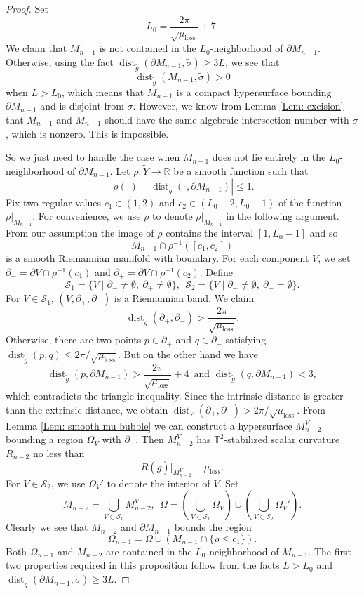 \documentclass[11pt,letterpaper]{amsart}
\numberwithin{equation}{section}
\theoremstyle{definition}
\DeclareMathOperator{\dist}{dist}
\begin{document}
\begin{proof}
Set
$$
L_0=\frac{2\pi}{\sqrt{\mu_{\mathrm{loss}}}}+7.
$$
We claim that $M_{n-1}$ is not contained in the $L_0$-neighborhood of $\partial M_{n-1}$. Otherwise, using the fact
$
\dist_{\tilde g}(\partial M_{n-1},\tilde \sigma)\geq 3L$,
we see that $$\dist_{\tilde g}(M_{n-1},\tilde \sigma)>0$$ when $L>L_0$, which means that $M_{n-1}$ is a compact hypersurface bounding $\partial M_{n-1}$ and is disjoint from $\tilde \sigma$. However, we know from Lemma \ref{Lem: excision} that $M_{n-1}$ and $\tilde M_{n-1}$ should have the same algebraic intersection number with $\sigma$, which is nonzero. This is impossible.

So we just need to handle the case when $M_{n-1}$ does not lie entirely in the $L_0$-neighborhood of $\partial M_{n-1}$. Let $\rho:\tilde Y\to \mathbb R$ be a smooth function such that
$$
|\rho(\cdot)-\dist_{\tilde g}(\cdot,\partial M_{n-1})|\leq 1.
$$
Fix two regular values $c_1\in(1,2)$ and $c_2\in(L_0-2,L_0-1)$ of the function $\rho|_{M_{n-1}}$. For convenience, we use $\rho$ to denote $\rho|_{M_{n-1}}$ in the following argument. From our assumption the image of $\rho$ contains the interval $[1,L_0-1]$ and so
$$
M_{n-1}\cap  \rho^{-1}([c_1,c_2])
$$
is a smooth Riemannian {manifold with boundary. For each component $V$, we set $\partial_-=\partial V\cap\rho^{-1}(c_1)$ and $\partial_+=\partial V\cap\rho^{-1}(c_2)$. Define
\[
\mathcal{S}_{1} = \{V \mid \partial_-\neq\emptyset, \ \partial_+\neq\emptyset\}, \ \
\mathcal{S}_{2} = \{V \mid \partial_-\neq\emptyset, \ \partial_+=\emptyset \}.
\]
For $V\in\mathcal{S}_{1}$, $(V,\partial_{+},\partial_{-})$ is a Riemannian band.} We claim
$$
\dist_{\tilde g}(\partial_+,\partial_-)>\frac{2\pi}{\sqrt{\mu_{\mathrm{loss}}}}.
$$
Otherwise, there are two points $p\in \partial_+$ and $q\in \partial_-$ satisfying $\dist_{\tilde g}(p,q)\leq 2\pi/\sqrt{\mu_{\mathrm{loss}}}$. But on the other hand we have
$$\dist_{\tilde g}(p,\partial M_{n-1})>\frac{2\pi}{\sqrt{\mu_{\mathrm{loss}}}}+4 \, \mbox{ and }  \dist_{\tilde g}(q,\partial M_{n-1})<3,$$
which contradicts the triangle inequality. Since the intrinsic distance is greater than the extrinsic distance, we obtain $\dist_V(\partial_+,\partial_-)>2\pi/\sqrt{\mu_{\mathrm{loss}}}$. From Lemma \ref{Lem: smooth mu bubble} we can construct a hypersurface $M_{n-2}^{V}$ bounding a region $\Omega_{V}$ with $\partial_-$. Then $M_{n-2}^{V}$ has $\mathbb T^2$-stabilized scalar curvature $R_{n-2}$ no less than
$$
R(\tilde g)|_{M_{n-2}^{V}}-\mu_{\mathrm{loss}}.
$$
{For $V\in\mathcal{S}_{2}$, we use $\Omega_{V}'$ to denote the interior of $V$. Set}
\[
M_{n-2} = \bigcup_{V\in\mathcal{S}_{1}}M_{n-2}^{V}, \ \
\Omega = \left(\bigcup_{V\in\mathcal{S}_{1}}\Omega_{V}\right)\cup\left(\bigcup_{V\in\mathcal{S}_{2}}\Omega_{V}'\right).
\]
Clearly we see that $M_{n-2}$ and $\partial M_{n-1}$ bounds the region
$$
\Omega_{n-1}=\Omega\cup(M_{n-1}\cap {\{\rho\leq c_{1}\}}).
$$
Both $\Omega_{n-1}$ and $M_{n-2}$ are contained in  the $L_0$-neighborhood of $M_{n-1}$. The first two properties required in this proposition follow from the facts $L>L_0$ and $\dist_{\tilde g}(\partial M_{n-1},\tilde \sigma)\geq 3L$.
\end{proof}
\end{document}
